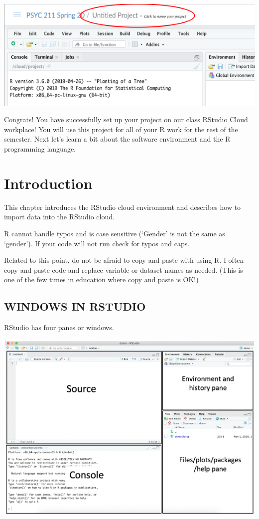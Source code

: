 \documentclass[
]{book}
\begin{document}
\includegraphics{img/Projname.png}

Congrats! You have successfully set up your project on our class RStudio Cloud workplace! You will use this project for all of your R work for the rest of the semester. Next let's learn a bit about the software environment and the R programming language.

\hypertarget{introduction}{%
\chapter{Introduction}\label{introduction}}

This chapter introduces the RStudio cloud environment and describes how to import data into the RStudio cloud.

R cannot handle typos and is case sensitive (`Gender' is not the same as `gender'). If your code will not run check for typos and caps.

Related to this point, do not be afraid to copy and paste with using R. I often copy and paste code and replace variable or dataset names as needed. (This is one of the few times in education where copy and paste is OK!)

\hypertarget{windows-in-rstudio}{%
\section{WINDOWS IN RSTUDIO}\label{windows-in-rstudio}}

RStudio has four panes or windows.

\includegraphics{img/rwindow.png}
\end{document}
